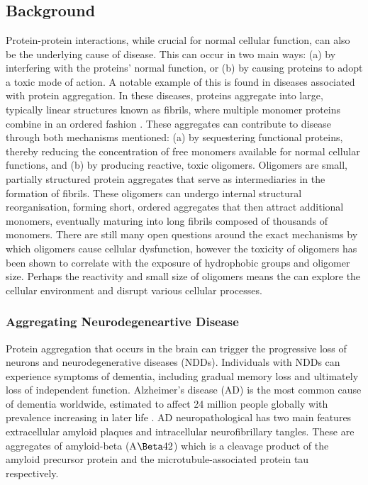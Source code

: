 \newcommand{\nc}[0]{n_{\mathrm{c}}}
\newcommand{\todo}[1]{{\color{red} [#1]}}

\chapter{\label{ch:4-aggregation}\chaggregation}

\minitoc

\section{Background}

Protein-protein interactions, while crucial for normal cellular function, can also be the underlying cause of disease. This can occur in two main ways: (a) by interfering with the proteins' normal function, or (b) by causing proteins to adopt a toxic mode of action. A notable example of this is found in diseases associated with protein aggregation. In these diseases, proteins aggregate into large, typically linear structures known as fibrils, where multiple monomer proteins combine in an ordered fashion \cite{chiti_protein_2006}. These aggregates can contribute to disease through both mechanisms mentioned: (a) by sequestering functional proteins, thereby reducing the concentration of free monomers available for normal cellular functions, and (b) by producing reactive, toxic oligomers. \cite{chiti_protein_2006, chiti_protein_2017} Oligomers are small, partially structured protein aggregates that serve as intermediaries in the formation of fibrils. These oligomers can undergo internal structural reorganisation, forming short, ordered aggregates that then attract additional monomers, eventually maturing into long fibrils composed of thousands of monomers. There are still many open questions around the exact mechanisms by which oligomers cause cellular dysfunction, however the toxicity of oligomers has been shown to correlate with the exposure of hydrophobic groups and oligomer size. \cite{chiti_protein_2017} Perhaps the reactivity and small size of oligomers means the can explore the cellular environment and disrupt various cellular processes.

\subsection{Aggregating Neurodegeneartive Disease}

Protein aggregation that occurs in the brain can trigger the progressive loss of neurons and neurodegenerative diseases (NDDs). Individuals with NDDs can experience symptoms of dementia, including gradual memory loss and ultimately loss of independent function. \cite{erkkinen_clinical_2018}  Alzheimer’s disease (AD) is the most common cause of dementia worldwide, estimated to affect 24 million people globally with prevalence increasing in later life \cite{reitz_epidemiology_2011}. AD neuropathological has two main features extracellular amyloid plaques and intracellular neurofibrillary tangles. These are aggregates of amyloid-beta (A$\Beta42$) which is a cleavage product of the amyloid precursor protein and the  microtubule-associated protein tau respectively.

